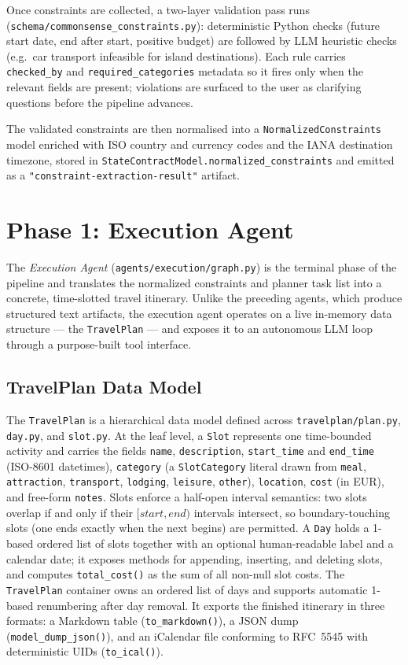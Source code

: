 \documentclass[a4paper,oneside,bibliography=totoc]{scrbook}
\begin{document}
Once constraints are collected, a two-layer validation pass runs
(\texttt{schema/commonsense\_constraints.py}): deterministic Python checks
(future start date, end after start, positive budget) are followed by LLM
heuristic checks (e.g.\ car transport infeasible for island destinations).
Each rule carries \texttt{checked\_by} and \texttt{required\_categories}
metadata so it fires only when the relevant fields are present; violations
are surfaced to the user as clarifying questions before the pipeline advances.

The validated constraints are then normalised into a
\texttt{NormalizedConstraints} model enriched with ISO country and currency
codes and the IANA destination timezone, stored in
\texttt{StateContractModel.normalized\_constraints} and emitted as a
\texttt{"constraint-extraction-result"} artifact.

\section{Phase 1: Execution Agent}
\label{sec:system:execution}
The \emph{Execution Agent} (\texttt{agents/execution/graph.py}) is the
terminal phase of the pipeline and translates the normalized constraints and
planner task list into a concrete, time-slotted travel itinerary.
Unlike the preceding agents, which produce structured text artifacts, the
execution agent operates on a live in-memory data structure — the
\texttt{TravelPlan} — and exposes it to an autonomous LLM loop through a
purpose-built tool interface.

\subsection{TravelPlan Data Model}
The \texttt{TravelPlan} is a hierarchical data model defined across
\texttt{travelplan/plan.py}, \texttt{day.py}, and \texttt{slot.py}.
At the leaf level, a \texttt{Slot} represents one time-bounded activity and
carries the fields \texttt{name}, \texttt{description},
\texttt{start\_time} and \texttt{end\_time} (ISO-8601 datetimes),
\texttt{category} (a \texttt{SlotCategory} literal drawn from
\texttt{meal}, \texttt{attraction}, \texttt{transport}, \texttt{lodging},
\texttt{leisure}, \texttt{other}),
\texttt{location}, \texttt{cost} (in EUR), and free-form \texttt{notes}.
Slots enforce a half-open interval semantics: two slots overlap if and only
if their $[\mathit{start}, \mathit{end})$ intervals intersect, so
boundary-touching slots (one ends exactly when the next begins) are permitted.
A \texttt{Day} holds a 1-based ordered list of slots together with an
optional human-readable label and a calendar date; it exposes methods for
appending, inserting, and deleting slots, and computes \texttt{total\_cost()}
as the sum of all non-null slot costs.
The \texttt{TravelPlan} container owns an ordered list of days and supports
automatic 1-based renumbering after day removal.
It exports the finished itinerary in three formats: a Markdown table
(\texttt{to\_markdown()}), a JSON dump (\texttt{model\_dump\_json()}), and
an iCalendar file conforming to RFC~5545 with deterministic UIDs
(\texttt{to\_ical()}).
\end{document}
